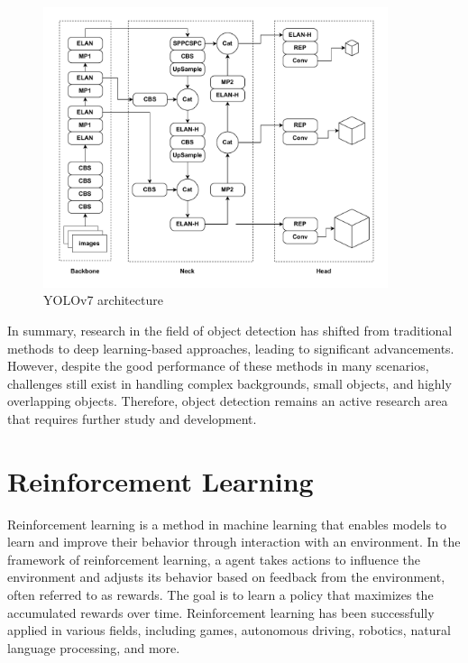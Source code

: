 \documentclass{PHlab-thesis}
\begin{document}
\begin{figure}[H]
    \centering 
    \includegraphics[width=0.9\textwidth]{images/YOLOv7 architecture.pdf}
    \caption{YOLOv7 architecture} 
    \label{Fig.YOLOv7 architecture} 
\end{figure}

In summary, research in the field of object detection has shifted from traditional methods to deep learning-based approaches, leading to significant advancements. However, despite the good performance of these methods in many scenarios, challenges still exist in handling complex backgrounds, small objects, and highly overlapping objects. Therefore, object detection remains an active research area that requires further study and development.

\section{Reinforcement Learning}
Reinforcement learning is a method in machine learning that enables models to learn and improve their behavior through interaction with an environment. In the framework of reinforcement learning, a agent takes actions to influence the environment and adjusts its behavior based on feedback from the environment, often referred to as rewards. The goal is to learn a policy that maximizes the accumulated rewards over time. Reinforcement learning has been successfully applied in various fields, including games, autonomous driving, robotics, natural language processing, and more.
\end{document}
